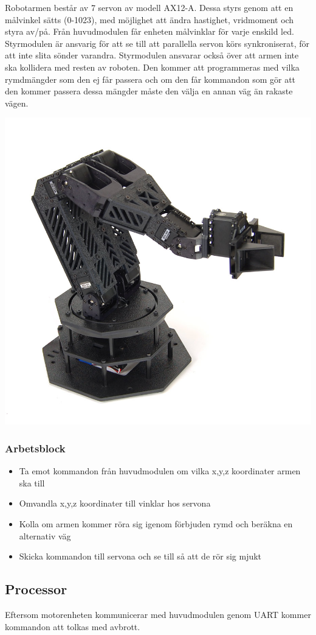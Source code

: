 Robotarmen består av 7 servon av modell AX12-A. Dessa styrs genom att en målvinkel sätts (0-1023), med möjlighet att ändra hastighet, vridmoment och styra av/på. Från huvudmodulen får enheten målvinklar för varje enskild led. Styrmodulen är ansvarig för att se till att parallella servon körs synkroniserat, för att inte slita sönder varandra. Styrmodulen ansvarar också över att armen inte ska kollidera med resten av roboten. Den kommer att programmeras med vilka rymdmängder som den ej får passera och om den får kommandon som gör att den kommer passera dessa mängder måste den välja en annan väg än rakaste vägen.  
\newline
\centerline{\includegraphics[scale=0.4]{arm}}


\subsubsection{Arbetsblock}

\begin{itemize}
\item Ta emot kommandon från huvudmodulen om vilka x,y,z koordinater armen ska till
\item Omvandla x,y,z koordinater till vinklar hos servona 
\item Kolla om armen kommer röra sig igenom förbjuden rymd och beräkna en alternativ väg
\item Skicka kommandon till servona och se till så att de rör sig mjukt
\end{itemize}

\subsection{Processor}

Eftersom motorenheten kommunicerar med huvudmodulen genom UART kommer kommandon att tolkas med avbrott.